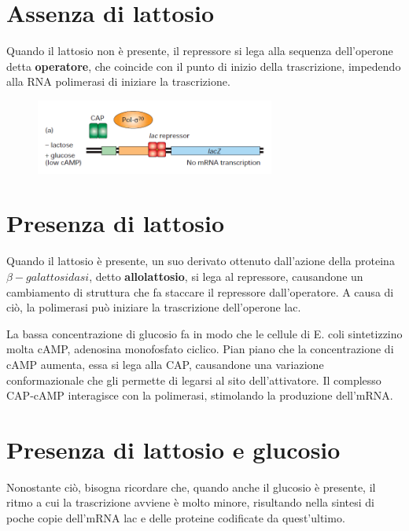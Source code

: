 \documentclass[10pt,a4paper]{article}
\begin{document}
	\section{Assenza di lattosio}
	
	Quando il lattosio non è presente, il repressore si lega alla sequenza dell'operone detta \textbf{operatore}, che coincide con il punto di inizio della trascrizione, impedendo alla RNA polimerasi di iniziare la trascrizione.
	
	\begin{figure}[h]
		\centering
		\includegraphics[width=0.7\textwidth]{operone no lac.png}	
	\end{figure}
	
	
	\section{Presenza di lattosio}
	
	Quando il lattosio è presente, un suo derivato ottenuto dall'azione della proteina $\beta-galattosidasi$, detto \textbf{allolattosio}, si lega al repressore, causandone un cambiamento di struttura che fa staccare il repressore dall'operatore. A causa di ciò, la polimerasi può iniziare la trascrizione dell'operone lac.
	
	La bassa concentrazione di glucosio fa in modo che le cellule di E. coli sintetizzino molta cAMP, adenosina monofosfato ciclico. Pian piano che la concentrazione di cAMP aumenta, essa si lega alla CAP, causandone una variazione conformazionale che gli permette di legarsi al sito dell'attivatore. Il complesso CAP-cAMP interagisce con la polimerasi, stimolando la produzione dell'mRNA.
	
	\section{Presenza di lattosio e glucosio}
	
	Nonostante ciò, bisogna ricordare che, quando anche il glucosio è presente, il ritmo a cui la trascrizione avviene è molto minore, risultando nella sintesi di poche copie dell'mRNA lac e delle proteine codificate da quest'ultimo.
	
\end{document}
